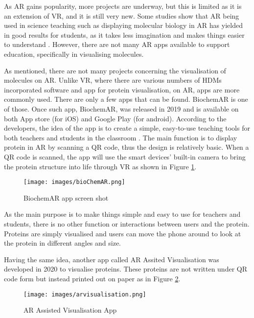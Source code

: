 As AR gains popularity, more projects are underway, but this is limited as it is an extension of VR, and it is still very new. Some studies show that AR being used in science teaching such as displaying molecular biology in AR has yielded in good results for students, as it takes less imagination and makes things easier to understand \parencite{cai_case_2014}. However, there are not many AR apps available to support education, specifically in visualising molecules. 

As mentioned, there are not many projects concerning the visualisation of molecules on AR. Unlike VR, where there are various numbers of HDMs incorporated software and app for protein visualisation, on AR, apps are more commonly used. There are only a few apps that can be found. BiochemAR is one of those. Once such app, BiochemAR, was released in 2019 and is available on both App store (for iOS) and Google Play (for android). According to the developers, the idea of the app is to create a simple, easy-to-use teaching tools for both teachers and students in the classroom \parencite{sung_biochemar_2020}. The main function is to display protein in AR by scanning a QR code, thus the design is relatively basic. When a QR code is scanned, the app will use the smart devices’ built-in camera to bring the protein structure into life through VR as shown in Figure \ref{fig:bioChemAR}.
\begin{figure}[!htbp]
	\centering
	\texttt{[image: images/bioChemAR.png]}
	\caption{BiochemAR app screen shot}
	\label{fig:bioChemAR}
\end{figure}



As the main purpose is to make things simple and easy to use for teachers and students, there is no other function or interactions between users and the protein. Proteins are simply visualised and users can move the phone around to look at the protein in different angles and size. 

Having the same idea, another app called  AR Assited Visualisation
was developed in 2020 to visualise proteins. These proteins are not written under QR code form but instead printed out on paper as in Figure \ref{fig:arvisualisation}. 

\begin{figure}[!htbp]
	\centering
	\texttt{[image: images/arvisualisation.png]}
	\caption{AR Assisted Visualisation App \parencite{eriksen_visualizing_2020}}
	\label{fig:arvisualisation}
\end{figure}


